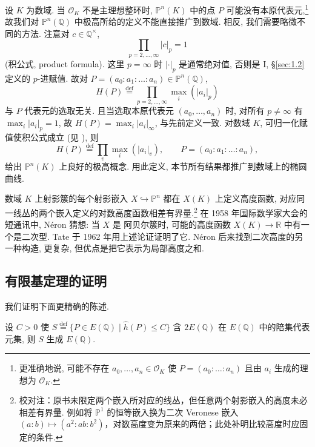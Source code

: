 \begin{remark} \label{thm:4.4.12} 
设 $K$ 为数域. 当 $\mathcal{O}_K$ 不是主理想整环时, $\mathbb{P}^n(K)$ 中的点 $P$ 可能没有本原代表元,\footnote{更准确地说, 可能不存在 $a_0, \dots, a_n\in\mathcal{O}_K$ 使 $P = (a_0:\dots:a_n)$ 且由 $a_i$ 生成的理想为 $\mathcal{O}_K$.} 故我们对 $\mathbb{P}^n(\mathbb{Q})$ 中极高所给的定义不能直接推广到数域. 相反, 我们需要略微不同的方法. 注意对 $c\in\mathbb{Q}^{\times}$,
\[
\prod_{p = 2, \dots, \infty}|c|_p = 1
\]
(积公式, product formula). 这里 $p = \infty$ 时 $|\cdot|_p$ 是通常绝对值, 否则是 I, \S\ref{sec:1.2} 定义的 $p$-进赋值. 故对 $P = (a_0:a_1:\dots:a_n)\in\mathbb{P}^n(\mathbb{Q})$,
\[
H(P) \overset{\text{def}}{=} \prod_{p = 2, \dots, \infty}\max_i(|a_i|_p)
\]
与 $P$ 代表元的选取无关. 且当选取本原代表元 $(a_0, \dots, a_n)$ 时, 对所有 $p\neq\infty$ 有 $\max_i|a_i|_p = 1$, 故 $H(P) = \max_i|a_i|_\infty$, 与先前定义一致. 对数域 $K$, 可归一化赋值使积公式成立 (见 \cite[8.8]{milne-ant}), 则
\[
H(P) \overset{\text{def}}{=} \prod_v \max_i(|a_i|_v), \qquad P = (a_0:a_1:\dots:a_n),
\]
给出 $\mathbb{P}^n(K)$ 上良好的极高概念. 用此定义, 本节所有结果都推广到数域上的椭圆曲线.
\end{remark}

\begin{remarkstar}
数域 $K$ 上射影簇的每个射影嵌入 $X\hookrightarrow\mathbb{P}^n$ 都在 $X(K)$ 上定义高度函数, 对应同一线丛的两个嵌入定义的对数高度函数相差有界量.\footnote{校对注：原书未限定两个嵌入所对应的线丛，但任意两个射影嵌入的高度未必相差有界量. 例如将 $\mathbb{P}^1$ 的恒等嵌入换为二次 Veronese 嵌入 $(a:b)\mapsto(a^2:ab:b^2)$，对数高度变为原来的两倍；此处补明比较高度时应固定的条件.} 在 1958 年国际数学家大会的短通讯中, N\'eron 猜想: 当 $X$ 是 阿贝尔簇时, 可能的高度函数 $X(K)\to\mathbb{R}$ 中有一个是二次型. Tate 于 1962 年用上述论证证明了它. N\'eron 后来找到二次高度的另一种构造, 更复杂, 但优点是把它表示为局部高度之和.
\end{remarkstar}

\subsection*{有限基定理的证明}

我们证明下面更精确的陈述.

\begin{proposition} \label{thm:4.4.13} 
设 $C > 0$ 使 $S \overset{\text{def}}{=} \{P\in E(\mathbb{Q}) \mid \hat{h}(P)\le C\}$ 含 $2E(\mathbb{Q})$ 在 $E(\mathbb{Q})$ 中的陪集代表元集, 则 $S$ 生成 $E(\mathbb{Q})$.
\end{proposition}

